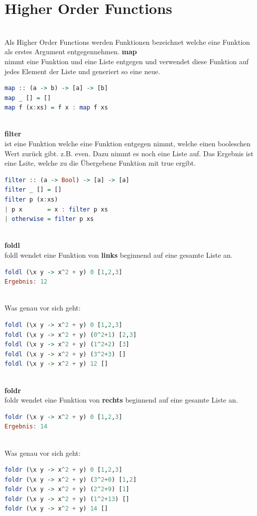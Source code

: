 \section{Higher Order Functions}\qquad\\
Als Higher Order Functions werden Funktionen bezeichnet welche eine Funktion als erstes Argument entgegennehmen.
\textbf{map} \\
nimmt eine Funktion und eine Liste entgegen und verwendet diese Funktion auf jedes Element der Liste und generiert so eine neue. 
\begin{lstlisting}[language=Haskell]
map :: (a -> b) -> [a] -> [b]  
map _ [] = []  
map f (x:xs) = f x : map f xs  
\end{lstlisting}\qquad\\
\textbf{filter}\\
ist eine Funktion welche eine Funktion entgegen nimmt, welche einen booleschen Wert zurück gibt. z.B. even. Dazu nimmt es noch eine Liste auf. Das Ergebnis ist eine Lsite, welche zu die Übergebene Funktion mit true ergibt. 
\begin{lstlisting}[language=Haskell]
filter :: (a -> Bool) -> [a] -> [a]  
filter _ [] = []  
filter p (x:xs)   
| p x       = x : filter p xs  
| otherwise = filter p xs  
\end{lstlisting}\qquad\\
\textbf{foldl}\qquad\\
foldl wendet eine Funktion von \textbf{links} beginnend auf eine gesamte Liste an. \\
\begin{lstlisting}[language=Haskell]
foldl (\x y -> x^2 + y) 0 [1,2,3]
Ergebnis: 12
\end{lstlisting}\qquad\\
Was genau vor sich geht: \\
\begin{lstlisting}[language=Haskell]
foldl (\x y -> x^2 + y) 0 [1,2,3]
foldl (\x y -> x^2 + y) (0^2+1) [2,3]
foldl (\x y -> x^2 + y) (1^2+2) [3]
foldl (\x y -> x^2 + y) (3^2+3) []
foldl (\x y -> x^2 + y) 12 []
\end{lstlisting}\qquad\\
\newline
\textbf{foldr}\qquad\\
foldr wendet eine Funktion von \textbf{rechts} beginnend auf eine gesamte Liste an. \\
\begin{lstlisting}[language=Haskell]
foldr (\x y -> x^2 + y) 0 [1,2,3]
Ergebnis: 14
\end{lstlisting}\qquad\\
Was genau vor sich geht: \\
\begin{lstlisting}[language=Haskell]
foldr (\x y -> x^2 + y) 0 [1,2,3]
foldr (\x y -> x^2 + y) (3^2+0) [1,2]
foldr (\x y -> x^2 + y) (2^2+9) [1]
foldr (\x y -> x^2 + y) (1^2+13) []
foldr (\x y -> x^2 + y) 14 []
\end{lstlisting}

